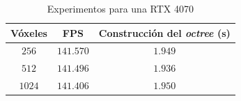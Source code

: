 \begin{table}
\centering
\begin{tabular}{|c|c|c|}
	\hline
	\textbf{Vóxeles} & \textbf{FPS} & \textbf{Construcción del \textit{octree} (s)} \\
	\hline
	$256$ & $141.570$ & $1.949$ \\
	\hline
	$512$ & $141.496$ & $1.936$ \\
	\hline
	$1024$ & $141.406$ & $1.950$ \\
	\hline
\end{tabular}
\caption{Experimentos para una RTX 4070}
\label{tab:pizzo-desktop}
\end{table}
